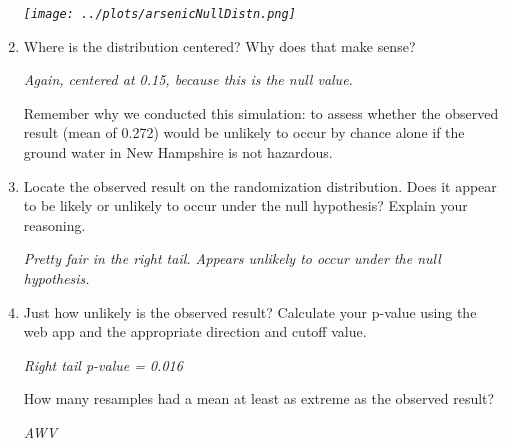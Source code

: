\begin{enumerate}
\begin{key}
  {\it \texttt{[image: ../plots/arsenicNullDistn.png]}}
\end{key}


\item 
 Where is the distribution centered?  Why does that make sense?
\begin{students}
  \vspace{1cm}
\end{students}
\begin{key}
  {\it Again, centered at 0.15, because this is the null value. }
\end{key}

Remember why we conducted this simulation: to assess whether the
observed result (mean of 0.272) would be unlikely to occur by chance
alone if the ground water in New Hampshire is not hazardous. 

\item Locate the observed result on the randomization distribution.
  Does it appear to be likely or unlikely to occur under the null
  hypothesis?  Explain your reasoning.
\begin{students}
  \vspace{1cm}
\end{students}

\begin{key}
  {\it Pretty fair in the right tail.  Appears unlikely to occur under
    the null hypothesis. } 
\end{key}

\item \label{pval13}Just how unlikely is the observed result?  Calculate your
  p-value using the web app and the appropriate direction and cutoff value.
\begin{students}
  \vspace{1cm}
\end{students}

\begin{key}
  {\it Right tail p-value = 0.016}
\end{key}

 How many  resamples had a mean at least as extreme as the
 observed result?  
\begin{students}
  \vspace{1cm}
\end{students}

\begin{key}
  {\it AWV}
\end{key}


\end{enumerate}
